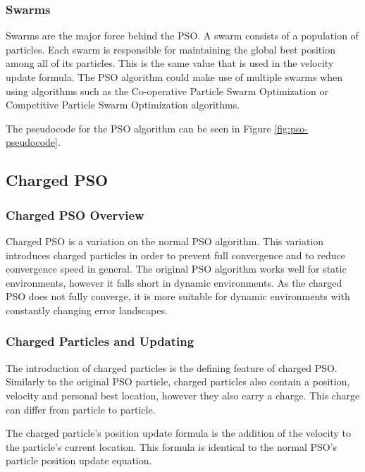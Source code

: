 \subsubsection{Swarms}
Swarms are the major force behind the PSO. A swarm consists of a population of particles. Each swarm is responsible for maintaining the global best position among all of its particles. This is the same value that is used in the velocity update formula. The PSO algorithm could make use of multiple swarms when using algorithms such as the Co-operative Particle Swarm Optimization or Competitive Particle Swarm Optimization algorithms.

The pseudocode for the PSO algorithm can be seen in Figure \ref{fig:pso-pseudocode}.

\subsection{Charged PSO}
\subsubsection{Charged PSO Overview}
Charged PSO is a variation on the normal PSO algorithm. This variation introduces charged particles in order to prevent full convergence and to reduce convergence speed in general. The original PSO algorithm works well for static environments, however it falls short in dynamic environments. As the charged PSO does not fully converge, it is more suitable for dynamic environments with constantly changing error landscapes.

\subsubsection{Charged Particles and Updating}
The introduction of charged particles is the defining feature of charged PSO. Similarly to the original PSO particle, charged particles also contain a position, velocity and personal best location, however they also carry a charge. This charge can differ from particle to particle. 

The charged particle's position update formula is the addition of the velocity to the particle's current location. This formula is identical to the normal PSO's particle position update equation.

